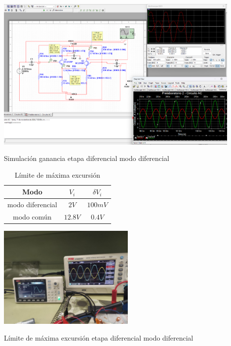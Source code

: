 \begin{ilustracion}[ht]
    \centering
    \includegraphics[width=0.9\textwidth]{src/images/p2/ganancia-etapa-diff-modo-diff.png}
    \caption{Simulación ganancia etapa diferencial modo diferencial}
    \label{ilus:sim-etapa-diferencial-ganancia-modo-diferencial}
\end{ilustracion}


\begin{table}[ht]
    \centering
    \begin{tabular}{|c|c|c|}
        \hline
        Modo & $V_i$ & $\delta V_i$ \\
        \hline
        modo diferencial & $2V$ & $100mV$ \\
        \hline
        modo común & $12.8V$ & $0.4V$ \\
        \hline
    \end{tabular}
    \caption{Límite de máxima excursión}
\end{table}


\begin{ilustracion}[ht]
    \centering
    \includegraphics[width=0.5\textwidth]{src/images/p2/limite-excursion-diferencial.jpg}
    \caption{Límite de máxima excursión etapa diferencial modo diferencial}
\end{ilustracion}

